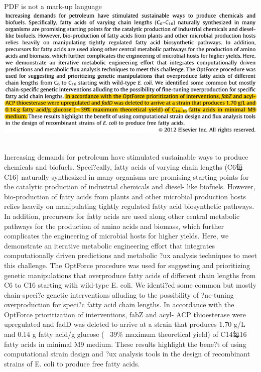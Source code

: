 \documentclass[11pt, handout]{beamer}
\begin{document}
\begin{frame}{PDF is not a mark-up language} 
~
\includegraphics[width=.85\textwidth]{sample_PDF.png}
~

{\tiny Increasing demands for petroleum have stimulated sustainable ways to produce chemicals and  biofuels. Speci?cally, fatty acids of varying chain lengths (C6每C16) naturally synthesized in many organisms are promising starting points for the catalytic production of industrial chemicals and diesel- like biofuels. However, bio-production of fatty acids from plants and other microbial production hosts relies heavily on manipulating tightly regulated fatty acid biosynthetic pathways. In addition,  precursors for fatty acids are used along other central metabolic pathways for the production of amino acids and biomass, which further complicates the engineering of microbial hosts for higher yields. Here, we demonstrate an iterative metabolic engineering effort that integrates computationally driven predictions and metabolic ?ux analysis techniques to meet this challenge. The OptForce procedure was used for suggesting and prioritizing genetic manipulations that overproduce fatty acids of different  chain lengths from C6 to C16 starting with wild-type E. coli. We identi?ed some common but mostly chain-speci?c genetic interventions alluding to the possibility of ?ne-tuning overproduction for speci?c fatty acid chain lengths. In accordance with the OptForce prioritization of interventions, fabZ and acyl- ACP thioesterase were upregulated and fadD was deleted to arrive at a strain that produces 1.70 g/L and 0.14 g fatty acid/g glucose (~ 39\% maximum theoretical yield) of C14每16 fatty acids in minimal M9 medium. These results highlight the bene?t of using computational strain design and ?ux analysis tools in the design of recombinant strains of E.  coli  to produce free fatty   acids.}
\end{frame}
\end{document}
